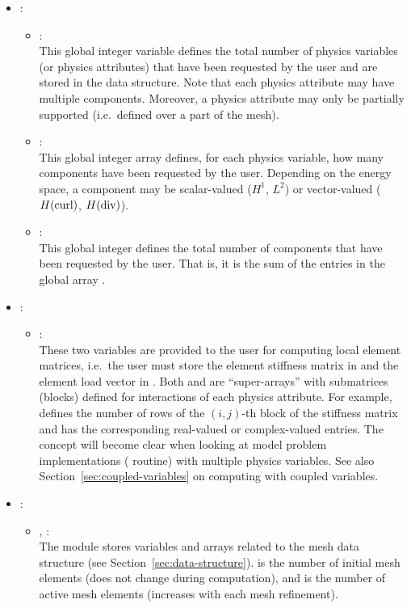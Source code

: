 \begin{itemize}
	\item
	{
		 : 
		\begin{itemize}
			\item{ :\\
			This global integer variable defines the total number of physics variables (or physics attributes) that have been requested by the user and are stored in the data structure. Note that each physics attribute may have multiple components. Moreover, a physics attribute may only be partially supported (i.e.~defined over a part of the mesh).
			} \item{ :\\
			This global integer array defines, for each physics variable, how many components have been requested by the user. Depending on the energy space, a component may be scalar-valued ($H^1$, $L^2$) or vector-valued ($H(\text{curl})$, $H(\text{div})$).
			} \item{ :\\
			This global integer defines the total number of components that have been requested by the user. That is, it is the sum of the entries in the global array .
		}
		\end{itemize}
	}
	\item
	{
		 :
		\begin{itemize}
			\item{ : \\
			These two variables are provided to the user for computing local element matrices, i.e.~the user must store the element stiffness matrix in  and the element load vector in . Both  and  are ``super-arrays'' with submatrices (blocks) defined for interactions of each physics attribute. For example,  defines the number of rows of the $(i,j)$-th block of the stiffness matrix and  has the corresponding real-valued or complex-valued entries. The concept will become clear when looking at model problem implementations ( routine) with multiple physics variables. See also Section~\ref{sec:coupled-variables} on computing with coupled variables.
			}
		\end{itemize}
	} 
	\item
	{
		 :
		\begin{itemize}
			\item {, :\\
			The  module stores variables and arrays related to the mesh data structure (see Section~\ref{sec:data-structure}).  is the number of initial mesh elements (does not change during computation), and  is the number of active mesh elements (increases with each mesh refinement).
			}
		\end{itemize}
	}
\end{itemize}

